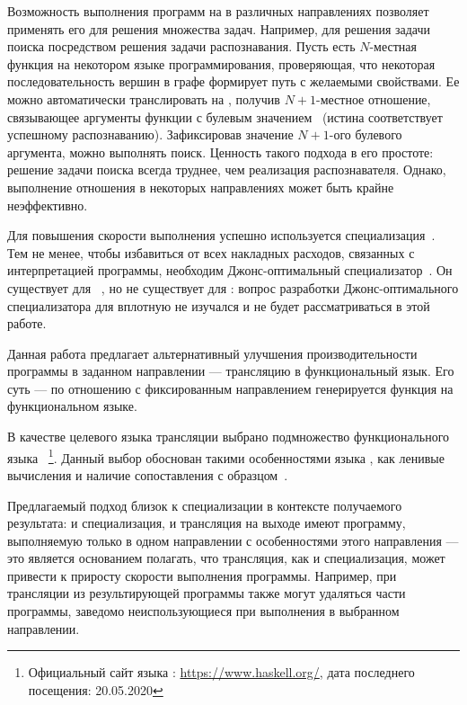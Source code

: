 Возможность выполнения программ на \miniKanren{} в различных направлениях позволяет применять его для решения множества задач.
Например, для решения задачи поиска посредством решения задачи распознавания.
Пусть есть $N$-местная функция на некотором языке программирования, проверяющая, что некоторая последовательность вершин в графе формирует путь с желаемыми свойствами.
Ее можно автоматически транслировать на \miniKanren{}, получив $N+1$-местное отношение, связывающее аргументы функции с булевым значением~\cite{lozov2019relational} (истина соответствует успешному распознаванию). 
Зафиксировав значение $N+1$-ого булевого аргумента, можно выполнять поиск.
Ценность такого подхода в его простоте: решение задачи поиска всегда труднее, чем реализация распознавателя. 
Однако, выполнение отношения в некоторых направлениях может быть крайне неэффективно. 

Для повышения скорости выполнения успешно используется специализация~\cite{lozov2019relational}.
Тем не менее, чтобы избавиться от всех накладных расходов, связанных с интерпретацией программы, необходим Джонс-оптимальный специализатор~\cite{jones1993partial}.
Он существует для \prolog{}~\cite{leuschel2004prolog}, но не существует для \miniKanren{}: вопрос разработки Джонс-оптимального специализатора для \miniKanren{} вплотную не изучался и не будет рассматриваться в этой работе.

Данная работа предлагает альтернативный улучшения производительности программы в заданном направлении --- трансляцию в функциональный язык.
Его суть --- по отношению с фиксированным направлением генерируется функция на функциональном языке.

В качестве целевого языка трансляции выбрано подмножество функционального языка \haskell{}~\footnote{Официальный сайт языка \haskell{}: \url{https://www.haskell.org/}, дата последнего посещения: 20.05.2020}.
Данный выбор обоснован такими особенностями языка \haskell{}, как ленивые вычисления и наличие сопоставления с образцом~\cite{Jones2003HHH, Hudak2007history, Lipovaca2011LYAH}.

Предлагаемый подход близок к специализации в контексте получаемого результата: и специализация, и трансляция на выходе имеют программу, выполняемую только в одном направлении с особенностями этого направления --- это является основанием полагать, что трансляция, как и специализация, может привести к приросту скорости выполнения программы.
Например, при трансляции из результирующей программы также могут удаляться части программы, заведомо неиспользующиеся при выполнения в выбранном направлении.

